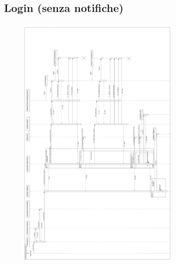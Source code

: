 \documentclass{article}
\begin{document}
	\subsection{Login (senza notifiche)}
		\begin{figure}[htbp]
		\centering
		\includegraphics[width=0.7\textwidth,height=0.7\textheight,keepaspectratio]{sequence_login.png}
		\label{fig:10}
	\end{figure}
	
	\newpage
	
\end{document}
